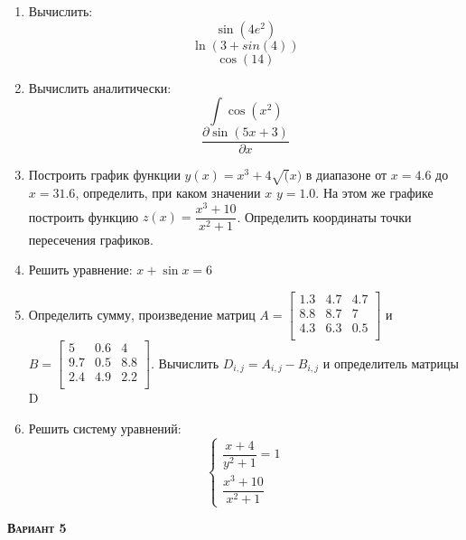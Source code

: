 \begin{enumerate}
\item Вычислить: 
\begin{equation*}\sin(4 e^2)                       \end{equation*}
\begin{equation*}\ln(3+sin(4))                     \end{equation*}
\begin{equation*}\cos(14)                          \end{equation*}

\item Вычислить аналитически: 
 \begin{equation*} \int \cos(x^2)          \end{equation*}\begin{equation*} {\dfrac{\partial \sin(5 x +3)}{\partial x}} \end{equation*}
\item Построить график функции $y(x)=x^3+4 \sqrt(x)   $ в диапазоне от $x=4.6$ до $x=31.6$, определить, при каком значении $x$ $y=1.0$. На этом же графике построить функцию $z(x)=\dfrac{x^3+10}{x^2+1}     $. Определить координаты точки пересечения графиков. \item Решить уравнение: $x+\sin{x}=6          $

\item Определить сумму, произведение матриц $A=\begin{bmatrix}
1.3 &4.7 &4.7 \\
8.8 &8.7 &7 \\
4.3 &6.3 &0.5 \\
\end{bmatrix}
$ и $B=\begin{bmatrix}
5 &0.6 &4 \\
9.7 &0.5 &8.8 \\
2.4 &4.9 &2.2 \\
\end{bmatrix}
$. Вычислить $D_{i,j}=A_{i,j}  -  B_{i,j}$ и определитель матрицы D

\item Решить систему уравнений: \begin{equation*} \begin{cases} \dfrac{x+4}{y^2+1}=1 \\ \dfrac{x^3+10}{x^2+1} \end{cases} \end{equation*} 

\end{enumerate}
\textsc{\textbf{Вариант 5}}

